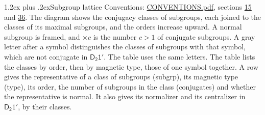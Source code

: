 \documentclass[10pt,a4paper]{article}
\makeatletter
\renewcommand\section{\@startsection{section}{1}{\z@}{-3ex plus -1ex minus -.2ex}%
  {1.2ex plus .2ex}{\normalfont\large\sffamily\bfseries\color{parttitle}}}
\numberwithin{equation}{section}
\newcommand{\grp}[1]{\mathsf{#1}}
\makeatother
\begin{document}
\section{Subgroup lattice}\label{s:subgroups}
Conventions: \href{../../CONVENTIONS.pdf}{CONVENTIONS.pdf}, sections \href{../../../rotation/CONVENTIONS.pdf\#conv.15}{15} and \href{../../CONVENTIONS.pdf\#conv.36}{36}.
The diagram shows the conjugacy classes of subgroups, each joined to the classes of its maximal subgroups, and the orders increase upward. \label{n:index.conjugates.c}A normal subgroup is framed, and ${\times}c$ is the number $c > 1$ of conjugate subgroups. \label{n:mark.letter}A gray letter after a symbol distinguishes the classes of subgroups with that symbol, which are not conjugate in $\grp{D_{2}1'}$. The table uses the same letters. The table lists the classes by order, then by magnetic type, those of one symbol together. \label{n:head.subgroup}\label{n:head.magnetic.type}\label{n:head.order}\label{n:head.conjugates}\label{n:head.normal}A row gives the representative of a class of subgroups (subgrp), its magnetic type (type), its order, the number of subgroups in the class (conjugates) and whether the representative is normal. \label{n:head.normalizer}\label{n:head.centralizer}It also gives its normalizer and its centralizer in $\grp{D_{2}1'}$, by their classes. 
\end{document}
